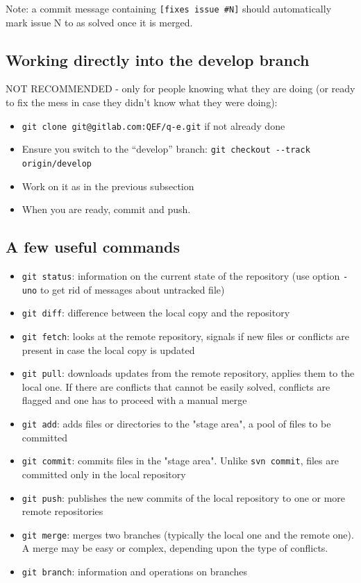 \documentclass[12pt,a4paper]{article}
\begin{document}
Note: a commit message containing \verb|[fixes issue #N]| should 
automatically mark issue N to as solved once it is merged.

\subsection{Working directly into the develop branch}
NOT RECOMMENDED - only for people knowing what they are doing 
(or ready to fix the mess in case they didn't know what they were doing):
\begin{itemize}
\item \verb|git clone git@gitlab.com:QEF/q-e.git| if not already done
\item Ensure you switch to the ``develop'' branch:
  \verb|git checkout --track origin/develop|
\item Work on it as in the previous subsection
\item When you are ready, commit and push.
\end{itemize}

\subsection{A few useful commands}
\begin{itemize}
\item \texttt{git status}: information on the current state of the repository 
(use option \texttt{-uno} to get rid of messages about untracked file)
\item \texttt{git diff}: difference between the local copy and the repository
\item  \texttt{git fetch}:
  looks at the remote repository, signals if new files or conflicts are present
  in case the local copy is updated
\item  \texttt{git pull}:
  downloads updates from the remote repository, applies them to the local one.
  If there are conflicts that cannot be easily solved, conflicts are flagged
  and one has to proceed with a manual merge
\item \texttt{git add}: adds files or directories to the "stage area", a pool
  of files to be committed
\item \texttt{git commit}: commits files in the "stage area". Unlike
  \texttt{svn commit}, files are committed only in the local repository
\item \texttt{git push}: publishes the new commits of the local repository
  to one or more remote repositories
\item \texttt{git merge}: merges two branches (typically the local one and
  the remote one). A merge may be easy or complex, depending upon the type of
  conflicts.
\item \texttt{git branch}: information and operations on branches
\end{itemize}
\end{document}
